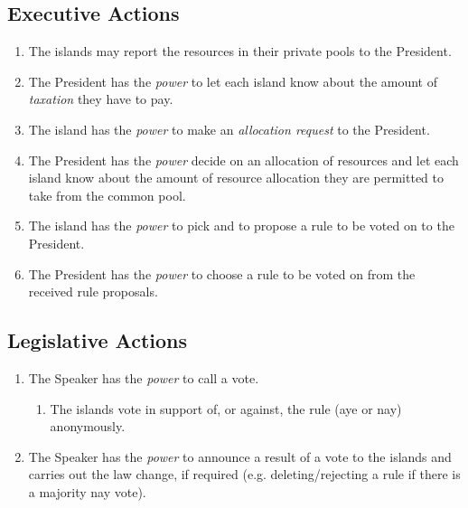 \subsection{Executive Actions}
\begin{enumerate}
    \item The islands may report the resources in their private pools to the President.
    \item The President has the \emph{power} to let each island know about the amount of \emph{taxation} they have to pay.
    \item The island has the \emph{power} to make an \emph{allocation request} to the President.
    \item The President has the \emph{power} decide on an allocation of resources and let each island know about the amount of resource allocation they are permitted to take from the common pool.
    \item The island has the \emph{power} to pick and to propose a rule to be voted on to the President.
    \item The President has the \emph{power} to choose a rule to be voted on from the received rule proposals.
\end{enumerate}
\subsection{Legislative Actions}
\begin{enumerate}
    \item The Speaker has the \emph{power} to call a vote.
        \begin{enumerate}
        \item The islands vote in support of, or against, the rule (aye or nay) anonymously.
        \end{enumerate}
    \item The Speaker has the \emph{power} to announce a result of a vote to the islands and carries out the law change, if required (e.g. deleting/rejecting a rule if there is a majority nay vote).
\end{enumerate}
